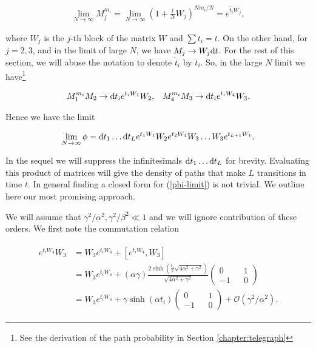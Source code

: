 \begin{align}
\lim_{N\rightarrow \infty} M_j^{m_i} =  \lim_{N\rightarrow \infty} ( 1+ \frac{t}{N}W_j)^{Nm_i/N} = e^{\tilde{t}_iW_j},
\end{align}

where $W_j$ is the $j$-th block of the matrix $W$ and $ \sum t_i = t$. On the other hand, for $j=2,3$, and in the limit of large $N$, we have $M_j \rightarrow W_j \mathrm{d} t $. For the rest of this section, we will abuse the notation to denote $\tilde{t}_i$ by $t_i$. So, in the large $N$ limit we have\footnote{See the derivation of the path probability in Section \ref{chapter:telegraph}}

\begin{align}
M_1^{m_i}M_2 \rightarrow \mathrm{d} t_i e^{t_iW_1}W_2, \; \; \; M_4^{m_i}M_3 \rightarrow \mathrm{d} t_i e^{t_iW_4}W_3.
\end{align}

Hence we have the limit 

\begin{align}\label{phi-limit}
\lim_{N\rightarrow \infty} \phi = \mathrm{d} t_1 \ldots \mathrm{d} t_L e^{t_1W_1}W_2e^{t_2W_4}W_3\ldots W_3e^{t_{L+1}W_1}.
\end{align}

In the sequel we will suppress the infinitesimals $\mathrm{d} t_1 \ldots \mathrm{d} t_L$ for brevity. Evaluating this product of matrices will give the density of paths that make $L$ transitions in time $t$. In general finding a closed form for (\ref{phi-limit}) is not trivial. We outline here our most promising approach. 

We will assume that $\gamma^2/\alpha^2, \gamma^2/\beta^2 \ll 1$ and we will ignore contribution of these orders. We first note the commutation relation

\begin{align}
\begin{split}
  e^{t_i W_4}W_3 &= W_3e^{t_i W_4} + \left[e^{t_i W_4}, W_3\right]  \\
  &=  W_3e^{t_i W_4} + (\alpha\gamma)\frac{2\sinh\left(\frac{t_i}{2}\sqrt{4\alpha^2+\gamma^2}\right)}{\sqrt{4\alpha^2+\gamma^2}} \begin{pmatrix} 0 && 1 \\ -1 && 0 \end{pmatrix}  \\
  &=  W_3e^{t_i W_4} + \gamma\sinh(\alpha t_i)  \begin{pmatrix} 0 && 1 \\ -1 && 0 \end{pmatrix} + \mathcal{O}(\gamma^2/\alpha^2).
 \end{split}
\end{align} 

